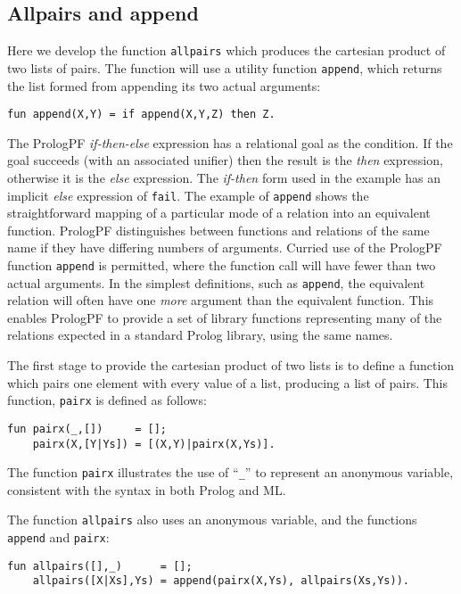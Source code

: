 \subsection{Allpairs and append}

Here we develop the function \texttt{allpairs} which produces the 
cartesian product of two lists of pairs.  The function will use a
utility function \texttt{append}, which returns the list formed from
appending its two actual arguments:
\begin{verbatim}
fun append(X,Y) = if append(X,Y,Z) then Z.
\end{verbatim}
The PrologPF \textit{if-then-else} expression has a relational goal as
the condition.  If the goal succeeds (with an associated unifier) then
the result is the \textit{then}
expression, otherwise it is the \textit{else} expression.  The \textit{if-then}
form used in the example has an implicit \textit{else} expression of \texttt{fail}.
The example of \texttt{append} shows the straightforward mapping of a particular mode
of a relation into an equivalent function.  PrologPF distinguishes between functions
and relations of the same name if they have differing numbers of arguments.  Curried
use of the PrologPF function \texttt{append} is permitted, where the function call will
have fewer than two actual arguments.  In the simplest definitions, such as \texttt{append},
the equivalent relation will often have one \textit{more} argument than the equivalent
function.  This enables PrologPF to provide a set of library functions representing many
of the relations expected in a standard Prolog library, using the same names.

The first stage to provide the cartesian product of two lists is to define a function
which pairs one element with every value of a list, producing a list of pairs.  This
function, \texttt{pairx} is defined as follows:
\begin{verbatim}
fun pairx(_,[])     = [];
    pairx(X,[Y|Ys]) = [(X,Y)|pairx(X,Ys)].
\end{verbatim}
The function \texttt{pairx} illustrates the use of ``\texttt{\_{}}'' to
represent an anonymous variable, consistent with the syntax in both Prolog and ML.

The function \texttt{allpairs} also uses an anonymous variable, and the functions
\texttt{append} and \texttt{pairx}:
\begin{verbatim}
fun allpairs([],_)      = [];
    allpairs([X|Xs],Ys) = append(pairx(X,Ys), allpairs(Xs,Ys)).
\end{verbatim}

